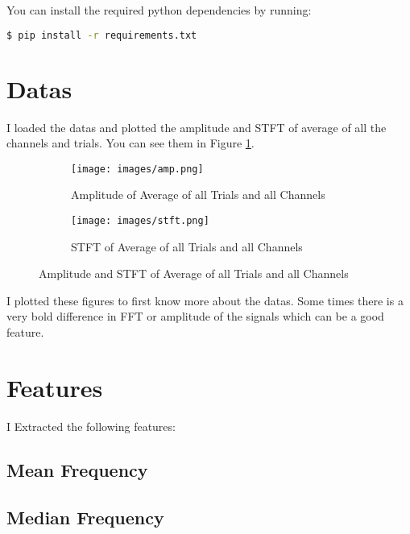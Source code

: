\documentclass[a4paper, openany]{book}
\begin{document}
You can install the required python dependencies by running:

\begin{lstlisting}[language=bash]
  $ pip install -r requirements.txt
  \end{lstlisting}

\newpage


	
\section{Datas}
	\vspace{0.3cm}
	
I loaded the datas and plotted the amplitude and STFT of average of all the channels and trials. You can see them in Figure \ref{fig:amp_stft}.


\begin{figure}[ht]
  \centering
  \begin{subfigure}[b]{0.7\linewidth}
    \texttt{[image: images/amp.png]}
    \caption{Amplitude of Average of all Trials and all Channels}
  \end{subfigure}
  \begin{subfigure}[b]{0.7\linewidth}
    \texttt{[image: images/stft.png]}
    \caption{STFT of Average of all Trials and all Channels}
  \end{subfigure}
  \caption{Amplitude and STFT of Average of all Trials and all Channels}
  \label{fig:amp_stft}
\end{figure}

I plotted these figures to first know more about the datas. Some times there is a very bold difference in FFT or amplitude of the signals which can be a good feature.



	\newpage


\section{Features}
	\vspace{0.3cm}



I Extracted the following features:

\subsection{Mean Frequency}


\subsection{Median Frequency}
\end{document}
